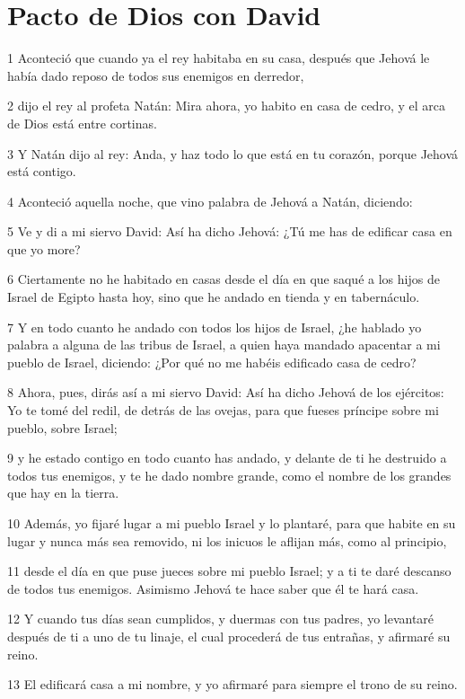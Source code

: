 \section*{Pacto de Dios con David}

\par 1 Aconteció que cuando ya el rey habitaba en su casa, después que Jehová le había dado reposo de todos sus enemigos en derredor,
\par 2 dijo el rey al profeta Natán: Mira ahora, yo habito en casa de cedro, y el arca de Dios está entre cortinas.
\par 3 Y Natán dijo al rey: Anda, y haz todo lo que está en tu corazón, porque Jehová está contigo.
\par 4 Aconteció aquella noche, que vino palabra de Jehová a Natán, diciendo:
\par 5 Ve y di a mi siervo David: Así ha dicho Jehová: ¿Tú me has de edificar casa en que yo more?
\par 6 Ciertamente no he habitado en casas desde el día en que saqué a los hijos de Israel de Egipto hasta hoy, sino que he andado en tienda y en tabernáculo.
\par 7 Y en todo cuanto he andado con todos los hijos de Israel, ¿he hablado yo palabra a alguna de las tribus de Israel, a quien haya mandado apacentar a mi pueblo de Israel, diciendo: ¿Por qué no me habéis edificado casa de cedro?
\par 8 Ahora, pues, dirás así a mi siervo David: Así ha dicho Jehová de los ejércitos: Yo te tomé del redil, de detrás de las ovejas, para que fueses príncipe sobre mi pueblo, sobre Israel;
\par 9 y he estado contigo en todo cuanto has andado, y delante de ti he destruido a todos tus enemigos, y te he dado nombre grande, como el nombre de los grandes que hay en la tierra.
\par 10 Además, yo fijaré lugar a mi pueblo Israel y lo plantaré, para que habite en su lugar y nunca más sea removido, ni los inicuos le aflijan más, como al principio,
\par 11 desde el día en que puse jueces sobre mi pueblo Israel; y a ti te daré descanso de todos tus enemigos. Asimismo Jehová te hace saber que él te hará casa.
\par 12 Y cuando tus días sean cumplidos, y duermas con tus padres, yo levantaré después de ti a uno de tu linaje, el cual procederá de tus entrañas, y afirmaré su reino.
\par 13 El edificará casa a mi nombre, y yo afirmaré para siempre el trono de su reino.
